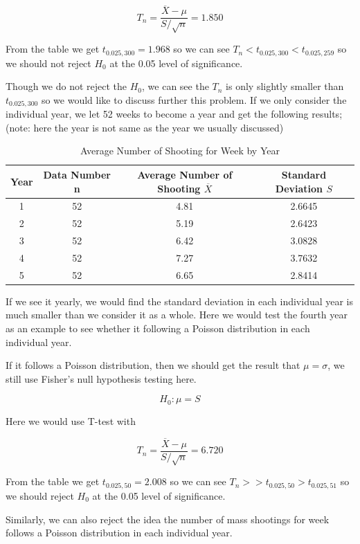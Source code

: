 \documentclass{article}
\begin{document}
$$T_n=\frac{\overline X-\mu}{S/\sqrt n}=1.850$$


From the table we get $t_{0.025,300}=1.968$ so we can see $T_n<t_{0.025,300}<t_{0.025,259}$ so we should not reject $H_0$ at the 0.05 level of significance.

Though we do not reject the $H_0$, we can see the $T_n$ is only slightly smaller than $t_{0.025,300}$ so we would like to discuss further this problem. If we only consider the individual year, we let 52 weeks to become a year and get the following results; (note: here the year is not same as the year we usually discussed)


\begin{table} [!htbp]
\begin{center}
\begin{tabular*} {14cm} {@{\extracolsep{\fill} }cccc} 
\toprule
Year & Data Number n &Average Number of Shooting $\overline X$ & Standard Deviation $S$\\
\midrule
1	&	52 & 4.81	& 2.6645\\
2	&	52   &	5.19 & 2.6423\\
3	&	52 & 6.42	& 3.0828\\
4	&	52   &	7.27  & 3.7632\\
5	&	52 & 6.65	& 2.8414\\
\bottomrule
\end{tabular*} 
\end{center}
\caption{Average Number of Shooting for  Week  by Year}
\end{table} 



If we see it yearly, we would find the standard deviation in each individual year is much smaller than we consider it as a whole. Here we would test the fourth year as an example to see whether it following a Poisson distribution in each individual year.

If it follows a Poisson distribution, then we should get the result that $\mu=\sigma$, we still use Fisher’s null hypothesis testing here.

$$H_0:\mu=S$$

Here we would use T-test with

$$T_n=\frac{\overline X-\mu}{S/\sqrt n}=6.720$$


From the table we get $t_{0.025,50}=2.008$ so we can see $T_n>>t_{0.025,50}>t_{0.025,51}$ so we should  reject $H_0$ at the 0.05 level of significance.

Similarly, we can also reject the idea the number of mass shootings for week follows a Poisson distribution in each individual year.
\end{document}
